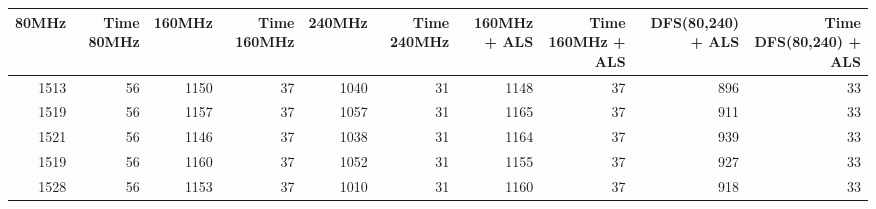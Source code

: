 \begin{tabular}{rrrrrrrrrr}
\toprule
 80MHz &  Time 80MHz &  160MHz &  Time 160MHz &  240MHz &  Time 240MHz &  160MHz + ALS &  Time 160MHz + ALS &  DFS(80,240) + ALS &  Time DFS(80,240) + ALS \\
\midrule
  1513 &          56 &    1150 &           37 &    1040 &           31 &          1148 &                 37 &                896 &                      33 \\
  1519 &          56 &    1157 &           37 &    1057 &           31 &          1165 &                 37 &                911 &                      33 \\
  1521 &          56 &    1146 &           37 &    1038 &           31 &          1164 &                 37 &                939 &                      33 \\
  1519 &          56 &    1160 &           37 &    1052 &           31 &          1155 &                 37 &                927 &                      33 \\
  1528 &          56 &    1153 &           37 &    1010 &           31 &          1160 &                 37 &                918 &                      33 \\
\bottomrule
\end{tabular}
